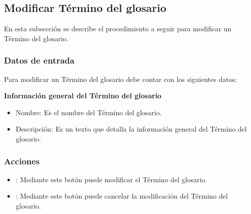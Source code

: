 \subsection{Modificar Término del glosario}
En esta subsección se describe el procedimiento a seguir para modificar un Término del glosario.

\subsubsection{Datos de entrada}
\begin{description}
	\item Para modificar un Término del glosario debe contar con los siguientes datos: \hspace{10pt}
	\begin{description}
	    \item \textbf{Información general del Término del glosario}
	    \begin{itemize}
		  \item Nombre: Es el nombre del Término del glosario.
		  \item Descripción: Es un texto que detalla la información general del Término del glosario.
	    \end{itemize}
	 \end{description}
\end{description}

\subsubsection{Acciones}
\begin{itemize}
 \item {}: Mediante este botón puede modificar el Término del glosario.
 \item {}: Mediante este botón puede cancelar la modificación del Término del glosario.
\end{itemize}
	
	
